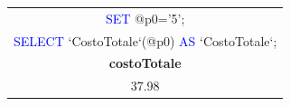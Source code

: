 \documentclass[10pt]{article}
\begin{document}
\begin{enumerate}[noitemsep]
\begin{lstlisting}[style=Mysql]
\end{lstlisting}
\begin{center}
		\begin{table}[H]
		\centering
		\label{table:fun2}
		\begin{tabular}{|c|}
			\hline
				\textcolor{blue}{SET} \textcolor{amber}{@}p0='5'; \\
				\textcolor{blue}{SELECT} `CostoTotale`(\textcolor{amber}{@}p0) \textcolor{blue}{AS} `CostoTotale`;
			 \\ \hline
			 \textbf{costoTotale} \\ \hline
			 37.98 \\ \hline
		\end{tabular}
	\end{table}
\end{center}
\end{enumerate}
\end{document}
